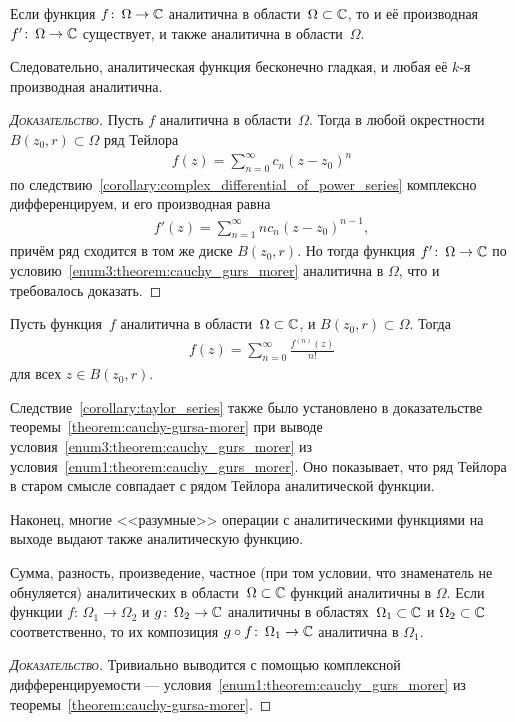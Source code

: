 \documentclass[../complex-analysis.tex]{subfiles}
\begin{document}
\begin{crly}
 Если функция $ f \colon\,\Omega\to\mathbb{C} $ аналитична в области~$ \Omega \subset \mathbb{C}$, то и её производная $ f' \colon\,\Omega\to\mathbb{C} $ существует, и также аналитична в области~$ \Omega $.

 Следовательно, аналитическая функция бесконечно гладкая, и любая её $ k $-я производная аналитична.
\end{crly}
\begin{proof}[\normalfont\textsc{Доказательство}]
 Пусть $ f $ аналитична в области~$ \Omega $. Тогда в любой окрестности~$ B(z_0, r) \subset \Omega $ ряд Тейлора
 \begin{align*}
  f(z) = \sum_{n=0}^{\infty} c_n (z-z_0)^{n}
 \end{align*} по следствию~\ref{corollary:complex_differential_of_power_series} комплексно дифференцируем, и его производная равна
 \begin{align*}
  f'(z) = \sum_{n=1}^{\infty} nc_n (z-z_0)^{n-1},
 \end{align*} причём ряд сходится в том же диске $ B(z_0,r) $. Но тогда функция $ f' \colon\,\Omega\to\mathbb{C} $ по условию~\ref{enum3:theorem:cauchy_gurs_morer} аналитична в $ \Omega $, что и требовалось доказать.
\end{proof}

\begin{crly}
 \label{corollary:taylor_series}
 Пусть функция~$ f $ аналитична в области~$ \Omega \subset \mathbb{C} $, и $ B(z_0, r) \subset \Omega $. Тогда
 \begin{align*}
  f(z) = \sum_{n=0}^{\infty} \frac{f^{(n)}(z)}{n!}
 \end{align*} для всех $ z \in B(z_0,r) $.
\end{crly}

Следствие~\ref{corollary:taylor_series} также было установлено в доказательстве теоремы~\ref{theorem:cauchy-gursa-morer} при выводе условия~\ref{enum3:theorem:cauchy_gurs_morer} из условия~\ref{enum1:theorem:cauchy_gurs_morer}. Оно показывает, что ряд Тейлора в старом смысле совпадает с рядом Тейлора аналитической функции.

Наконец, многие <<разумные>> операции с аналитическими функциями на выходе выдают также аналитическую функцию.
\begin{crly}
 \label{corollary:Simple Operations with Analytics Funs}
 Сумма, разность, произведение, частное (при том условии, что знаменатель не обнуляется) аналитических в области~$ \Omega \subset \mathbb{C} $ функций аналитичны в $ \Omega $. Если функции $ f \colon\,\Omega_1 \to \Omega_2 $ и $ g \colon\,\Omega_2 \to \mathbb{C} $ аналитичны в областях~$ \Omega_1 \subset \mathbb{C}$ и $ \Omega_2 \subset \mathbb{C} $ соответственно, то их композиция $ g \circ f \colon\,\Omega_1 \to \mathbb{C} $ аналитична в $ \Omega_1 $.
\end{crly}
\begin{proof}[\normalfont\textsc{Доказательство}]
 Тривиально выводится с помощью комплексной дифференцируемости --- условия~\ref{enum1:theorem:cauchy_gurs_morer} из теоремы~\ref{theorem:cauchy-gursa-morer}.
\end{proof}
\end{document}
